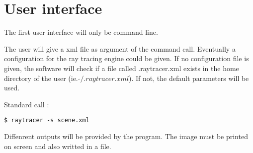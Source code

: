 \section{User interface}
The first user interface will only be command line.

The user will give a xml file as argument of the command call. Eventually a configuration for the ray tracing engine could be given. If no configuration file is given, the software will check if a file called .raytracer.xml exists in the home directory of the user (ie. $\widetilde{}/.raytracer.xml$). If not, the default parameters will be used.

Standard call :

  \texttt{\$\ raytracer -s scene.xml}

Diffenrent outputs will be provided by the program. The image must be printed on screen and also writted in a file.

